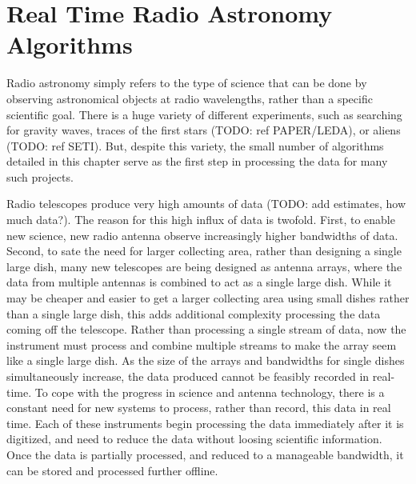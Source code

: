 \chapter{Real Time Radio Astronomy Algorithms}
\label{chap:Real Time Radio Astronomy Algorithms}




Radio astronomy simply refers to the type of science that can be done by observing astronomical objects at radio wavelengths, rather than a specific scientific goal. 
There is a huge variety of different experiments, such as searching for gravity waves, traces of the first stars (TODO: ref PAPER/LEDA), or aliens (TODO: ref SETI).
But, despite this variety, the small number of algorithms detailed in this chapter serve as the first step in processing the data for many such projects.



Radio telescopes produce very high amounts of data (TODO: add estimates, how much data?). 
The reason for this high influx of data is twofold. 
First, to enable new science, new radio antenna observe increasingly higher bandwidths of data. 
Second, to sate the need for larger collecting area, rather than designing a single large dish, many new telescopes are being designed as antenna arrays, where the data from multiple antennas is combined to act as a single large dish.
While it may be cheaper and easier to get a larger collecting area using small dishes rather than a single large dish, this adds additional complexity processing the data coming off the telescope.
Rather than processing a single stream of data, now the instrument must process and combine multiple streams to make the array seem like a single large dish.
As the size of the arrays and bandwidths for single dishes simultaneously increase, the data produced cannot be feasibly recorded in real-time. 
To cope with the progress in science and antenna technology, there is a constant need for new systems to process, rather than record, this data in real time.
Each of these instruments begin processing the data immediately after it is digitized, and need to reduce the data without loosing scientific information.
Once the data is partially processed, and reduced to a manageable bandwidth, it can be stored and processed further offline.



